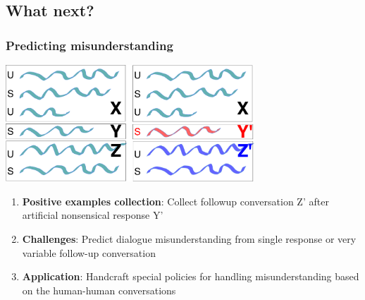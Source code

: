 \documentclass[10pt, compress,british,xcolor={svgnames,dvipsnames,x11names},trans]{beamer}
\begin{document}


\subsection{What next?}  %

\begin{frame}\frametitle{Predicting misunderstanding}
    \begin{center}
    \includegraphics[width=0.7\textwidth]{./misunderstaning}
    \end{center}
    \begin{enumerate}
        \item {\bf Positive examples collection}: Collect followup conversation Z' after artificial nonsensical response Y' \\
        \item {\bf Challenges}: Predict dialogue misunderstanding from single response or very variable follow-up conversation \\ 
        \item {\bf Application}: Handcraft special policies for handling misunderstanding based on the human-human conversations 
    \end{enumerate}
\end{frame}
\end{document}
